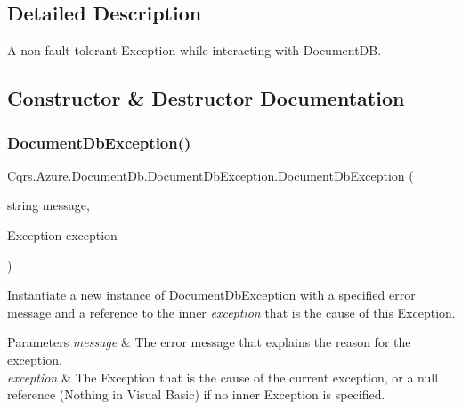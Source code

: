 \subsection{Detailed Description}
A non-\/fault tolerant Exception while interacting with Document\+DB. 



\subsection{Constructor \& Destructor Documentation}
\mbox{\label{classCqrs_1_1Azure_1_1DocumentDb_1_1DocumentDbException_a19e08be1e69ac87230e739e784f3c6b6_a19e08be1e69ac87230e739e784f3c6b6}} 
\subsubsection{\texorpdfstring{Document\+Db\+Exception()}{DocumentDbException()}\hspace{0.1cm}{\footnotesize\ttfamily [1/2]}}
{\footnotesize\ttfamily Cqrs.\+Azure.\+Document\+Db.\+Document\+Db\+Exception.\+Document\+Db\+Exception (\begin{DoxyParamCaption}\item[{string}]{message,  }\item[{Exception}]{exception }\end{DoxyParamCaption})}



Instantiate a new instance of \hyperlink{classCqrs_1_1Azure_1_1DocumentDb_1_1DocumentDbException}{Document\+Db\+Exception} with a specified error message and a reference to the inner {\itshape exception}  that is the cause of this Exception. 


\begin{DoxyParams}{Parameters}
{\em message} & The error message that explains the reason for the exception.\\
\hline
{\em exception} & The Exception that is the cause of the current exception, or a null reference (Nothing in Visual Basic) if no inner Exception is specified.\\
\hline
\end{DoxyParams}
\mbox{\label{classCqrs_1_1Azure_1_1DocumentDb_1_1DocumentDbException_a0fe55ab6d2a689b055460557d4f50fe7_a0fe55ab6d2a689b055460557d4f50fe7}} 
